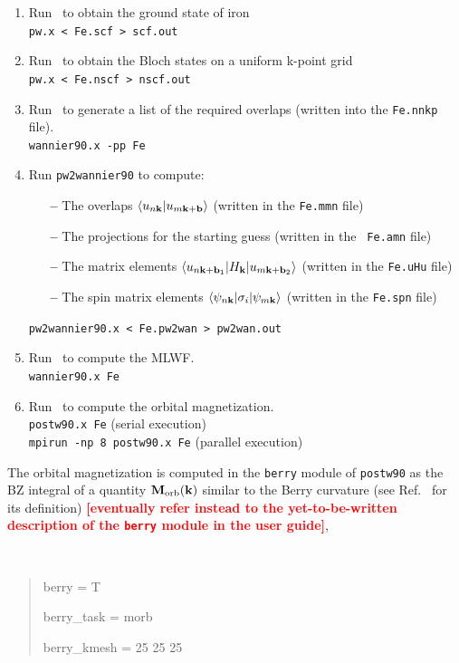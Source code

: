 \documentclass[a4paper,11pt,twoside]{article}
\def\tent#1{\textcolor{red}{#1}}     %
\begin{document}
\begin{enumerate}
\item Run \pwscf\ to obtain the ground state of iron\\
{\tt pw.x < Fe.scf > scf.out}

\item Run \pwscf\ to obtain the Bloch states on a uniform k-point
  grid\\ 
{\tt pw.x < Fe.nscf > nscf.out}

\item Run \wannier\ to generate a list of the required overlaps (written
  into the {\tt Fe.nnkp} file).\\
{\tt wannier90.x -pp Fe}


\item Run {\tt pw2wannier90} to compute:
  \begin{itemize}

  \item[{\bf --}] The overlaps $\langle u_{n{\bf k}}\vert u_{m{\bf k}+{\bf
          b}}\rangle$ (written in the {\tt Fe.mmn} file)

  \item[{\bf --}] The projections for the starting guess (written in the {\tt
        Fe.amn} file)

  \item[{\bf --}] The matrix elements $\langle u_{n{\bf k}+{\bf b}_1}\vert
      H_{\bf k}\vert u_{m{\bf k}+{\bf b}_2}\rangle$ (written in the
      {\tt Fe.uHu} file)

  \item[{\bf --}] The spin matrix elements $\langle \psi_{n{\bf
        k}}\vert \sigma_i\vert \psi_{m{\bf k}}\rangle$ (written in the
    {\tt Fe.spn} file)

  \end{itemize}
{\tt pw2wannier90.x < Fe.pw2wan > pw2wan.out}

\item Run \wannier\ to compute the MLWF.\\
{\tt wannier90.x Fe}

\item Run \postw\ to compute the orbital magnetization.\\
  {\tt postw90.x Fe} (serial execution)\\
  {\tt mpirun -np 8 postw90.x Fe} (parallel execution)


\end{enumerate}

The orbital magnetization is computed in the {\tt berry} module of
{\tt postw90} as the BZ integral of a quantity ${\bf M}_{\rm orb}({\bf
  k})$ similar to the Berry curvature (see Ref.~\cite{lopez-prb12} for
its definition) \tent{{\bf [eventually refer instead to the yet-to-be-written
description of the {\tt berry} module in the user guide]}}, 
%
{\tt
\begin{quote}
berry = T

berry\_task = morb

berry\_kmesh = 25 25 25

\end{quote} }
\end{document}
